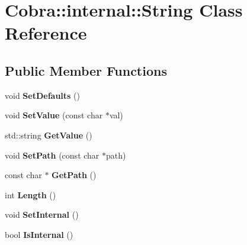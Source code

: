 \hypertarget{class_cobra_1_1internal_1_1_string}{\section{Cobra\+:\+:internal\+:\+:String Class Reference}
\label{class_cobra_1_1internal_1_1_string}
}
\subsection*{Public Member Functions}
\begin{DoxyCompactItemize}
\item 
\hypertarget{class_cobra_1_1internal_1_1_string_aa15375397ad0c4285825ec4c7b43e292}{void {\bfseries Set\+Defaults} ()}\label{class_cobra_1_1internal_1_1_string_aa15375397ad0c4285825ec4c7b43e292}

\item 
\hypertarget{class_cobra_1_1internal_1_1_string_a3b71e1d8e3fa402e5b5f9c003438ca22}{void {\bfseries Set\+Value} (const char $\ast$val)}\label{class_cobra_1_1internal_1_1_string_a3b71e1d8e3fa402e5b5f9c003438ca22}

\item 
\hypertarget{class_cobra_1_1internal_1_1_string_ae9a49934e2693f5245c79739025c4897}{std\+::string {\bfseries Get\+Value} ()}\label{class_cobra_1_1internal_1_1_string_ae9a49934e2693f5245c79739025c4897}

\item 
\hypertarget{class_cobra_1_1internal_1_1_string_af051b388ccb8fbd0816062bbce072507}{void {\bfseries Set\+Path} (const char $\ast$path)}\label{class_cobra_1_1internal_1_1_string_af051b388ccb8fbd0816062bbce072507}

\item 
\hypertarget{class_cobra_1_1internal_1_1_string_ade3cf71da3c0c32ebfd076e12b1d21bf}{const char $\ast$ {\bfseries Get\+Path} ()}\label{class_cobra_1_1internal_1_1_string_ade3cf71da3c0c32ebfd076e12b1d21bf}

\item 
\hypertarget{class_cobra_1_1internal_1_1_string_ad2f8be7ec1cff02df6982b734c5f5c57}{int {\bfseries Length} ()}\label{class_cobra_1_1internal_1_1_string_ad2f8be7ec1cff02df6982b734c5f5c57}

\item 
\hypertarget{class_cobra_1_1internal_1_1_string_a135533cb9ea817121c4ff17e617b8b6f}{void {\bfseries Set\+Internal} ()}\label{class_cobra_1_1internal_1_1_string_a135533cb9ea817121c4ff17e617b8b6f}

\item 
\hypertarget{class_cobra_1_1internal_1_1_string_a22835ce420c9176d2a1ba03dae6bc61e}{bool {\bfseries Is\+Internal} ()}\label{class_cobra_1_1internal_1_1_string_a22835ce420c9176d2a1ba03dae6bc61e}

\end{DoxyCompactItemize}
